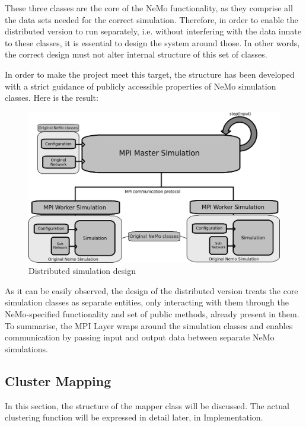 These three classes are the core of the NeMo functionality, as they comprise all the data sets needed for the correct simulation. Therefore, in order to enable the distributed version to run separately, i.e. without interfering with the data innate to these classes, it is essential to design the system around those. In other words, the correct design must not alter internal structure of this set of classes.

In order to make the project meet this target, the structure has been developed with a strict guidance of publicly accessible properties of NeMo simulation classes. Here is the result:

\begin{figure}[h!]
\begin{center}
\includegraphics[scale = 0.5]{images/design/distributed_version_separated_design.png}
\end{center}
\caption{Distributed simulation design}
\end{figure}

As it can be easily observed, the design of the distributed version treats the core simulation classes as separate entities, only interacting with them through the NeMo-specified functionality and set of public methods, already present in them. To summarise, the MPI Layer wraps around the simulation classes and enables communication by passing input and output data between separate NeMo simulations.

\subsection{Cluster Mapping}

In this section, the structure of the mapper class will be discussed. The actual clustering function will be expressed in detail later, in Implementation.

